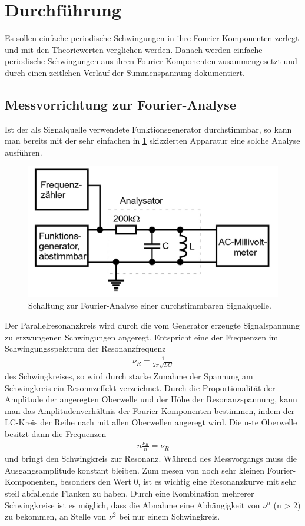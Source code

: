 \section{Durchführung}
\label{sec:Durchführung}

Es sollen einfache periodische Schwingungen in ihre Fourier-Komponenten zerlegt und mit den Theoriewerten verglichen werden.
Danach werden einfache periodische Schwingungen aus ihren Fourier-Komponenten zusammengesetzt und durch einen zeitlchen Verlauf der Summenspannung dokumentiert.

\subsection{Messvorrichtung zur Fourier-Analyse}
\label{sec:Analyse}
Ist der als Signalquelle verwendete Funktionsgenerator durchstimmbar, so kann man bereits mit der sehr einfachen in \ref{fig:abb2} skizzierten Apparatur eine solche Analyse ausführen.
\begin{figure}
  \centering
  \includegraphics[width=\textwidth]{abb2.jpg}
  \caption{Schaltung zur Fourier-Analyse einer durchstimmbaren Signalquelle.}
  \label{fig:abb2}
\end{figure}
Der Parallelresonanzkreis wird durch die vom Generator erzeugte Signalspannung zu erzwungenen Schwingungen angeregt.
Entspricht eine der Frequenzen im Schwingungsspektrum der Resonanzfrequenz
\begin{align}
  \nu_R = \frac{1}{2 \pi \sqrt{L C}}
\end{align}
des Schwingkreises, so wird durch starke Zunahme der Spannung am Schwingkreis ein Resonnzeffekt verzeichnet.
Durch die Proportionalität der Amplitude der angeregten Oberwelle und der Höhe der Resonanzspannung, kann man das Amplitudenverhältnis der Fourier-Komponenten bestimmen, 
indem der LC-Kreis der Reihe nach mit allen Oberwellen angeregt wird.
Die n-te Oberwelle besitzt dann die Frequenzen
\begin{align}
  n \frac{\nu_R}{n} = \nu_R
\end{align}
und bringt den Schwingkreis zur Resonanz.
Während des Messvorgangs muss die Ausgangsamplitude konstant bleiben.
Zum mesen von noch sehr kleinen Fourier-Komponenten, besonders den Wert 0, ist es wichtig eine Resonanzkurve mit sehr steil abfallende Flanken zu haben.
Durch eine Kombination mehrerer Schwingkreise ist es möglich, dass die Abnahme eine Abhängigkeit von $\nu^n$ (n > 2) zu bekommen, an Stelle von $\nu^2$ bei nur einem Schwingkreis.

